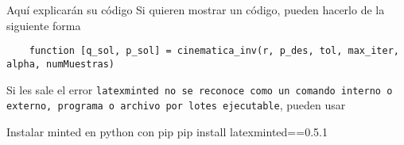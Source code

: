 Aquí explicarán su código
Si quieren mostrar un código, pueden hacerlo de la siguiente forma

\begin{verbatim}
	function [q_sol, p_sol] = cinematica_inv(r, p_des, tol, max_iter, alpha, numMuestras)
\end{verbatim}

Si les sale el error \texttt{latexminted no se reconoce como un comando interno o externo, programa o archivo por lotes ejecutable}, pueden usar 
\begin{terminal}{Instalar minted en python con pip}
	pip install latexminted==0.5.1
\end{terminal}
